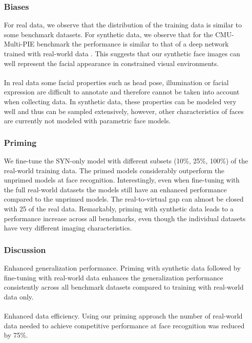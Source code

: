 \documentclass[12pt]{article}
\begin{document}
\subsubsection{Biases}
For real data, we observe that the distribution of the training data
is similar to some benchmark datasets. For synthetic data, we observe
that for the CMU-Multi-PIE benchmark the performance is
similar to that of a deep network trained with real-world data . This suggests that our synthetic face images can well
represent the facial appearance in constrained visual environments.\\
\\
In real data some facial properties such as head pose, illumination or facial expression
are difficult to annotate and therefore cannot be taken into
account when collecting data. In synthetic data, these properties can be modeled very well and thus can be sampled
extensively, however, other characteristics of faces are currently not modeled with parametric face models.
\subsubsection{Priming}
We fine-tune the SYN-only model with different subsets (10\%, 25\%, 100\%) of the real-world training data. The
primed models considerably outperform the unprimed models at face recognition. Interestingly, even when fine-tuning
with the full real-world datasets the models still have an enhanced performance compared to the unprimed models. The real-to-virtual gap can almost be closed with 25%
of the real data. Remarkably, priming with synthetic data
leads to a performance increase across all benchmarks, even
though the individual datasets have very different imaging
characteristics.
\subsubsection{Discussion}
Enhanced generalization performance. Priming with
synthetic data followed by fine-tuning with real-world
data enhances the generalization performance consistently
across all benchmark datasets compared to training with
real-world data only.\\
\\
Enhanced data efficiency. Using our priming approach
the number of real-world data needed to achieve competitive performance at face recognition was reduced by 75\%.
\end{document}

